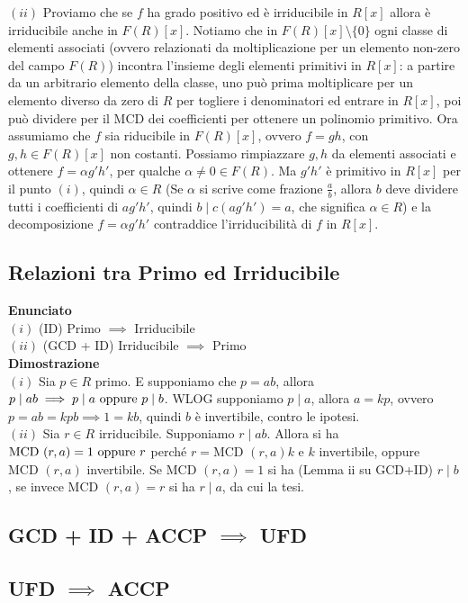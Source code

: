 \documentclass[a4paper,GeneralMath,NoNotes]{stdmdoc}
\newcommand{\Enunciato}{\vskip 0.05cm \noindent \textbf{Enunciato} \\ }
\renewcommand{\Dimostrazione}{\vskip 0.05cm \noindent \textbf{Dimostrazione} \\ }
\newcommand{\MCD}{\text{MCD }}
\begin{document}
		$(ii)$ \frdx Proviamo che se $f$ ha grado positivo ed è irriducibile in $R[x]$ allora è irriducibile anche in $F(R)[x]$. Notiamo che in $F(R)[x] \setminus \{0\}$ ogni classe di elementi associati (ovvero relazionati da moltiplicazione per un elemento non-zero del campo $F(R)$) incontra l'insieme degli elementi primitivi in $R[x]$: a partire da un arbitrario elemento della classe, uno può prima moltiplicare per un elemento diverso da zero di $R$ per togliere i denominatori ed entrare in $R[x]$, poi può dividere per il MCD dei coefficienti per ottenere un polinomio primitivo. Ora assumiamo che $f$ sia riducibile in $F(R)[x]$, ovvero $f = gh$, con $g, h \in F(R)[x]$ non costanti. Possiamo rimpiazzare $g, h$ da elementi associati e ottenere $f = \alpha g' h'$, per qualche $\alpha \neq 0 \in F(R)$. Ma $g'h'$ è primitivo in $R[x]$ per il punto $(i)$, quindi $\alpha \in R$ (Se $\alpha$ si scrive come frazione $\frac{a}{b}$, allora $b$ deve dividere tutti i coefficienti di $ag'h'$, quindi $b \mid c(ag'h') = a$, che significa $\alpha \in R$) e la decomposizione $f = \alpha g'h'$ contraddice l'irriducibilità di $f$ in $R[x]$.

	\subsection{Relazioni tra Primo ed Irriducibile}
	\Enunciato
		$(i)$ (ID) Primo $\implies$ Irriducibile \\
		$(ii)$ (GCD + ID) Irriducibile $\implies$ Primo \\
	\Dimostrazione
		$(i)$ Sia $p \in R$ primo. E supponiamo che $p = ab$, allora $p \mid ab \implies p \mid a \text{ oppure } p \mid b$. WLOG supponiamo $p \mid a$, allora $a = kp$, ovvero $p = ab = kpb \implies 1 = kb$, quindi $b$ è invertibile, contro le ipotesi. \\
		$(ii)$ Sia $r \in R$ irriducibile. Supponiamo $r \mid ab$. Allora si ha $\MCD(r,a) = 1 \opp r$ perché $r = \MCD(r,a) k$ e $k$ invertibile, oppure $\MCD(r,a)$ invertibile. Se $\MCD(r,a) = 1$ si ha (Lemma ii su GCD+ID) $r \mid b$, se invece $\MCD(r,a) = r$ si ha $r \mid a$, da cui la tesi. \\

	\subsection{GCD + ID + ACCP $\implies$ UFD}

	\subsection{UFD $\implies$ ACCP}
\end{document}
